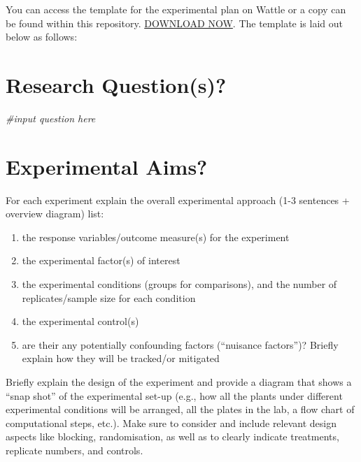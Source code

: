 \documentclass[
]{book}
\newenvironment{Shaded}{\begin{snugshade}}{\end{snugshade}}
\newcommand{\CommentTok}[1]{\textcolor[rgb]{0.56,0.35,0.01}{\textit{#1}}}
\providecommand{\tightlist}{%
  \setlength{\itemsep}{0pt}\setlength{\parskip}{0pt}}
\begin{document}
You can access the template for the experimental plan on Wattle or a copy can be found within this repository. \href{\%223.\%20Statistical\%20Methods\%20in\%20Biology\%20-\%20Chapter\%203.pdf\%22}{DOWNLOAD NOW}. The template is laid out below as follows:

\hypertarget{research-questions}{%
\section{Research Question(s)?}\label{research-questions}}

\begin{Shaded}
\begin{Highlighting}[]
\CommentTok{\#input question here}
\end{Highlighting}
\end{Shaded}

\hypertarget{experimental-aims}{%
\section{Experimental Aims?}\label{experimental-aims}}

For each experiment explain the overall experimental approach (1-3 sentences + overview diagram) list:

\begin{enumerate}
\def\labelenumi{\arabic{enumi})}
\tightlist
\item
  the response variables/outcome measure(s) for the experiment
\item
  the experimental factor(s) of interest
\item
  the experimental conditions (groups for comparisons), and the number of replicates/sample size for each condition
\item
  the experimental control(s)
\item
  are their any potentially confounding factors (``nuisance factors'')? Briefly explain how they will be tracked/or mitigated
\end{enumerate}

Briefly explain the design of the experiment and provide a diagram that shows a ``snap shot'' of the experimental set-up (e.g., how all the plants under different experimental conditions will be arranged, all the plates in the lab, a flow chart of computational steps, etc.). Make sure to consider and include relevant design aspects like blocking, randomisation, as well as to clearly indicate treatments, replicate numbers, and controls.
\end{document}
